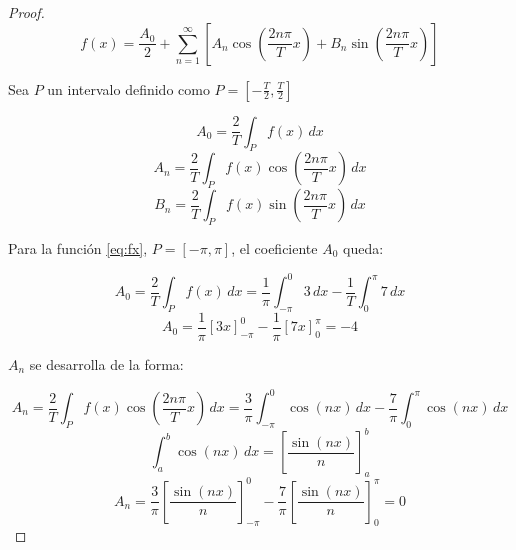 \documentclass{article}[12pt,a4paper]
\begin{document}
\begin{proof}

  \begin{equation}
    f(x)=\frac{A_0}{2}+\sum_{n=1}^{\infty}\left[A_n\cos\left(\frac{2n\pi}{T}x\right)+B_n\sin\left(\frac{2n\pi}{T}x\right)\right]
    \label{eq:fourierseries}
  \end{equation}

  Sea \(P\) un intervalo definido como \(P=\left[-\frac{T}{2},\frac{T}{2}\right]\)

  \begin{equation}
    A_0=\frac{2}{T}\int_{P}f(x)\,dx
    \label{eq:a0coeff}
  \end{equation}
  \begin{equation}
    A_n=\frac{2}{T}\int_{P}f(x)\cos\left(\frac{2n\pi}{T}x\right)\,dx
    \label{eq:ancoeff}
  \end{equation}
  \begin{equation}
    B_n=\frac{2}{T}\int_{P}f(x)\sin\left(\frac{2n\pi}{T}x\right)\,dx
    \label{eq:bncoeff}
  \end{equation}

  Para la función \ref{eq:fx}, \(P=\left[-\pi,\pi\right]\), el coeficiente \(A_0\) queda:

  \begin{equation*}
    A_0=\frac{2}{T}\int_{P}f(x)\,dx=\frac{1}{\pi}\int_{-\pi}^{0}3\,dx-\frac{1}{T}\int_{0}^{\pi}7\,dx
  \end{equation*}
  \begin{equation}
    A_0=\frac{1}{\pi}\left[3x\right]_{-\pi}^{0}-\frac{1}{\pi}\left[7x\right]_{0}^{\pi}=-4
    \label{eq:a0coeffr}
  \end{equation}

  \(A_n\) se desarrolla de la forma:

  \begin{equation*}
    A_n=\frac{2}{T}\int_{P}f(x)\cos\left(\frac{2n\pi}{T}x\right)\,dx=\frac{3}{\pi}\int_{-\pi}^{0}\cos\left(nx\right)\,dx-\frac{7}{\pi}\int_{0}^{\pi}\cos\left(nx\right)\,dx
  \end{equation*}
  \begin{equation*}
    \int_{a}^{b}\cos\left(nx\right)\,dx=\left[\frac{\sin\left(nx\right)}{n}\right]_{a}^{b}
  \end{equation*}
  \begin{equation}
    A_n=\frac{3}{\pi}\left[\frac{\sin\left(nx\right)}{n}\right]_{-\pi}^{0}-\frac{7}{\pi}\left[\frac{\sin\left(nx\right)}{n}\right]_{0}^{\pi}=0
    \label{eq:ancoeffr}
  \end{equation}


\end{proof}
\end{document}
